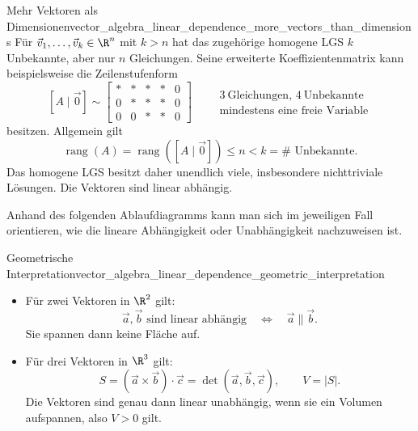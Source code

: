\begin{KeyPointBox}{Mehr Vektoren als Dimensionen}{vector_algebra_linear_dependence_more_vectors_than_dimensions}
  Für $\vec v_1,\dots,\vec v_k\in\R^n$ mit $k>n$ hat das zugehörige
  homogene LGS $k$ Unbekannte, aber nur $n$ Gleichungen. Seine erweiterte
  Koeffizientenmatrix kann beispielsweise die Zeilenstufenform
  \[
    [A\mid\vec0]\sim
    \left[
      \begin{array}{cccc|c}
        \ast&\ast&\ast&\ast&0\\
        0&\ast&\ast&\ast&0\\
        0&0&\ast&\ast&0
      \end{array}
    \right]
    \qquad
    \begin{gathered}
      3~\text{Gleichungen, }4~\text{Unbekannte}\\[-0.1em]
      \text{mindestens eine freie Variable}
    \end{gathered}
  \]
  besitzen. Allgemein gilt
  \[
    \operatorname{rang}(A)=\operatorname{rang}([A\mid\vec0])
    \le n<k=\#\text{ Unbekannte}.
  \]
  Das homogene LGS besitzt daher unendlich viele, insbesondere nichttriviale
  Lösungen. Die Vektoren sind linear abhängig.
\end{KeyPointBox}

Anhand des folgenden Ablaufdiagramms kann man sich im jeweiligen Fall
orientieren, wie die lineare Abhängigkeit oder Unabhängigkeit nachzuweisen ist.
\begin{center}
\end{center}

\begin{KeyPointBox}{Geometrische Interpretation}{vector_algebra_linear_dependence_geometric_interpretation}
  \begin{itemize}[leftmargin=1.6em,itemsep=0.55em,topsep=0.2em]
    \item Für zwei Vektoren in $\R^2$ gilt:
      \[
        \vec a,\vec b\text{ sind linear abhängig}
        \quad\Longleftrightarrow\quad
        \vec a\parallel\vec b.
      \]
      Sie spannen dann keine Fläche auf.
    \item Für drei Vektoren in $\R^3$ gilt:
      \[
        S=(\vec a\times\vec b)\cdot\vec c
        =\det(\vec a,\vec b,\vec c),
        \qquad
        V=|S|.
      \]
      Die Vektoren sind genau dann linear unabhängig, wenn sie ein Volumen
      aufspannen, also $V>0$ gilt.
  \end{itemize}
\end{KeyPointBox}

